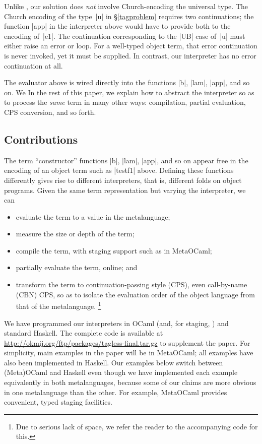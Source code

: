 Unlike \citet{JFP-Mogensen},
our solution does \emph{not} involve Church-encoding the
universal type. The Church encoding of the type~|u| in \S\ref{tagproblem}
requires two continuations; the function |app| in the interpreter above would
have to provide both to the encoding of~|e1|. The continuation
corresponding to the |UB| case of~|u| must either raise an error or
loop. For a well-typed object term, that error continuation is never
invoked, yet it must be supplied. In contrast, our interpreter has no error
continuation at all.

The evaluator above is wired directly into the
functions |b|, |lam|, |app|, and so on.  \ifshort We \else In the rest of this paper, we \fi
explain how to abstract the interpreter so as
to process the \emph{same} term in many other
ways: compilation, partial evaluation, CPS
conversion, and so forth.

\subsection{Contributions}\label{contributions}

The term ``constructor'' functions |b|, |lam|, |app|, and so on appear
free in the encoding of an object term such as |testf1| above.  Defining
these functions differently gives rise to different interpreters, that
is, different folds on object programs.  Given the same term
representation but varying the interpreter, we can
\begin{itemize}
    \item evaluate the term to a value in the metalanguage;
    \item measure the size or depth of the term;
    \item compile the term, with staging support such as in MetaOCaml;
    \item partially evaluate the term, online; and
    \item transform the term to continuation\hyp passing style (CPS),
        even call-by-name (CBN) CPS, so as to isolate the evaluation
        order of the object language from that of the metalanguage.\ifshort
\footnote{Due to serious lack of space, 
we refer the reader to the accompanying code for this.}\fi
\end{itemize}
We have programmed our interpreters in OCaml (and, for staging,
\citet{metaocaml}) and standard Haskell. The complete code is
available at \url{http://okmij.org/ftp/packages/tagless-final.tar.gz}
to supplement the paper. 
\ifshort For simplicity, main examples in the paper will be in MetaOCaml;
all examples have also been implemented in Haskell.
\else Our examples below switch between (Meta)OCaml
and Haskell even though we have implemented each example equivalently in
both metalanguages, because some of our claims are more obvious in one
metalanguage than the other.  For example, MetaOCaml provides
convenient, typed staging facilities.\fi

